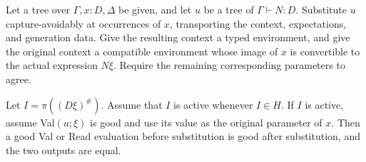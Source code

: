 \begin{lemma}\label{obs:substitution}
Let a tree over $\Gamma,x:D,\Delta$ be given, and let $u$ be a tree of
$\Gamma\vdash N:D$.  Substitute $u$ capture-avoidably at occurrences
of $x$, transporting the context, expectations, and generation data.
Give the resulting context a typed environment, and give the original
context a compatible environment whose image of $x$ is convertible to
the actual expression $N\xi$.  Require the remaining corresponding
parameters to agree.

Let $I=\pi((D\xi)^\#)$.  Assume that $I$ is active whenever $I\in H$.
If $I$ is active, assume Val$(u;\xi)$ is good and use its value as the
original parameter of $x$.  Then a good Val or Read evaluation before
substitution is good after substitution, and the two outputs are equal.
\end{lemma}
